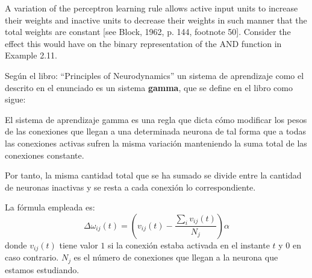 \begin{problem}[14]
 A variation of the perceptron learning rule allows active input units to increase their
weights and inactive units to decrease their weights in such manner that the total
weights are constant [see Block, 1962, p. 144, footnote 50]. Consider the effect this
would have on the binary representation of the AND function in Example 2.11.

\solution

Según el libro: ``Principles of Neurodynamics'' un sistema de aprendizaje como el descrito en el enunciado es un sistema \textbf{gamma}, que se define en el libro como sigue:

\begin{defn}
El sistema de aprendizaje gamma es una regla que dicta cómo modificar los pesos de las conexiones que llegan a una determinada neurona de tal forma que a todas las conexiones activas sufren la misma variación manteniendo la suma total de las conexiones constante.

Por tanto, la misma cantidad total que se ha sumado se divide entre la cantidad de neuronas inactivas y se resta a cada conexión lo correspondiente.

La fórmula empleada es:
\[Δ ω_{ij}(t)=\left(v_{ij}(t)-\frac{\sum_i v_{ij}(t)}{N_j}\right)α\]
donde $v_{ij}(t)$ tiene valor $1$ si la conexión estaba activada en el instante $t$ y $0$ en caso contrario. $N_j$ es el número de conexiones que llegan a la neurona que estamos estudiando.
\end{defn}


\end{problem}
